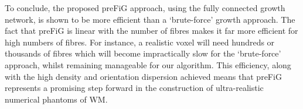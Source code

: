 To conclude, the proposed \ac{preFiG} approach, using the fully connected growth network, is shown to be more efficient than a `brute-force' growth approach.
The fact that \ac{preFiG} is linear with the number of fibres makes it far more efficient for high numbers of fibres. For instance, a realistic voxel will need hundreds or thousands of fibres which will become impractically slow for the `brute-force' approach, whilst remaining manageable for our algorithm.
This efficiency, along with the high density and orientation dispersion achieved means that \ac{preFiG} represents a promising step forward in the construction of ultra-realistic numerical phantoms of WM.


